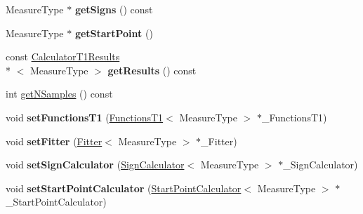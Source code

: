 \begin{DoxyCompactItemize}
\item 
\hypertarget{class_ox_1_1_calculator_t1_a1fb7d7a8ab324b807447a5757d8e20f9}{Measure\-Type $\ast$ {\bfseries get\-Signs} () const }\label{class_ox_1_1_calculator_t1_a1fb7d7a8ab324b807447a5757d8e20f9}

\item 
\hypertarget{class_ox_1_1_calculator_t1_a4d430a63b313f8ae1197a27842e87d47}{Measure\-Type $\ast$ {\bfseries get\-Start\-Point} ()}\label{class_ox_1_1_calculator_t1_a4d430a63b313f8ae1197a27842e87d47}

\item 
\hypertarget{class_ox_1_1_calculator_t1_a55406cd104fb7d67925ece789161e2c9}{const \hyperlink{struct_ox_1_1_calculator_t1_results}{Calculator\-T1\-Results}\\*
$<$ Measure\-Type $>$ {\bfseries get\-Results} () const }\label{class_ox_1_1_calculator_t1_a55406cd104fb7d67925ece789161e2c9}

\item 
int \hyperlink{class_ox_1_1_calculator_t1_a8a11b3b6c0dcbc461c11dc55600d7992}{get\-N\-Samples} () const 
\item 
\hypertarget{class_ox_1_1_calculator_t1_a88e23f6ffa2903dc14a6133a90203f02}{void {\bfseries set\-Functions\-T1} (\hyperlink{class_ox_1_1_functions_t1}{Functions\-T1}$<$ Measure\-Type $>$ $\ast$\-\_\-\-Functions\-T1)}\label{class_ox_1_1_calculator_t1_a88e23f6ffa2903dc14a6133a90203f02}

\item 
\hypertarget{class_ox_1_1_calculator_t1_a106746ffcc08288c933c4dc210589f35}{void {\bfseries set\-Fitter} (\hyperlink{class_ox_1_1_fitter}{Fitter}$<$ Measure\-Type $>$ $\ast$\-\_\-\-Fitter)}\label{class_ox_1_1_calculator_t1_a106746ffcc08288c933c4dc210589f35}

\item 
\hypertarget{class_ox_1_1_calculator_t1_ae043a486f1db48e46a3e011e4a3d76b3}{void {\bfseries set\-Sign\-Calculator} (\hyperlink{class_ox_1_1_sign_calculator}{Sign\-Calculator}$<$ Measure\-Type $>$ $\ast$\-\_\-\-Sign\-Calculator)}\label{class_ox_1_1_calculator_t1_ae043a486f1db48e46a3e011e4a3d76b3}

\item 
\hypertarget{class_ox_1_1_calculator_t1_a89628a47da5bf7baddcd87f687613096}{void {\bfseries set\-Start\-Point\-Calculator} (\hyperlink{class_ox_1_1_start_point_calculator}{Start\-Point\-Calculator}$<$ Measure\-Type $>$ $\ast$\-\_\-\-Start\-Point\-Calculator)}\label{class_ox_1_1_calculator_t1_a89628a47da5bf7baddcd87f687613096}


\end{DoxyCompactItemize}
